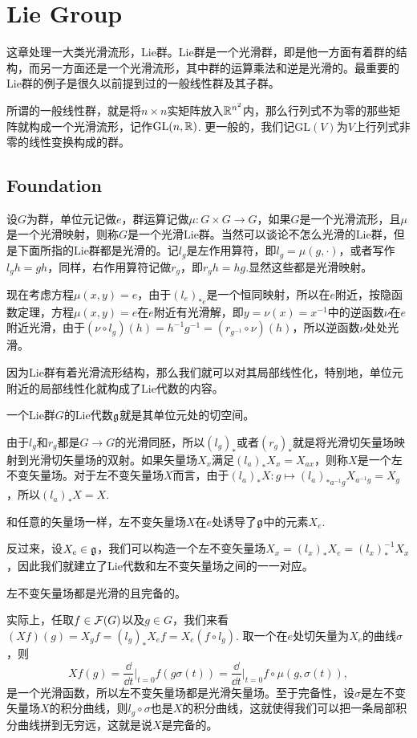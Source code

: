 \chapter{Lie Group}

这章处理一大类光滑流形，Lie群。Lie群是一个光滑群，即是他一方面有着群的结构，而另一方面还是一个光滑流形，其中群的运算乘法和逆是光滑的。最重要的Lie群的例子是很久以前提到过的一般线性群及其子群。

所谓的一般线性群，就是将$n\times n$实矩阵放入$\mathbb{R}^{n^2}$内，那么行列式不为零的那些矩阵就构成一个光滑流形，记作$\mathrm{GL}(n,\mathbb{R})$. 更一般的，我们记$\mathrm{GL}(V)$为$V$上行列式非零的线性变换构成的群。

\section{Foundation}

\para 设$G$为群，单位元记做$e$，群运算记做$\mu:G\times G\to G$，如果$G$是一个光滑流形，且$\mu$是一个光滑映射，则称$G$是一个光滑Lie群。当然可以谈论不怎么光滑的Lie群，但是下面所指的Lie群都是光滑的。记$l_g$是左作用算符，即$l_g=\mu(g,\cdot)$，或者写作$l_gh=gh$，同样，右作用算符记做$r_g$，即$r_gh=hg$.显然这些都是光滑映射。

现在考虑方程$\mu(x,y)=e$，由于$(l_e)_{*e}$是一个恒同映射，所以在$e$附近，按隐函数定理，方程$\mu(x,y)=e$在$e$附近有光滑解，即$y=\nu(x)=x^{-1}$中的逆函数$\nu$在$e$附近光滑，由于$(\nu\circ l_g)(h)=h^{-1}g^{-1}=(r_{g^{-1}}\circ \nu)(h)$，所以逆函数$\nu$处处光滑。

因为Lie群有着光滑流形结构，那么我们就可以对其局部线性化，特别地，单位元附近的局部线性化就构成了Lie代数的内容。

\para 一个Lie群$G$的Lie代数${\mathfrak{g}}$就是其单位元处的切空间。

由于$l_g$和$r_g$都是$G\to G$的光滑同胚，所以$(l_g)_*$或者$(r_g)_*$就是将光滑切矢量场映射到光滑切矢量场的双射。如果矢量场$X_x$满足$(l_a)_*X_x=X_{ax}$，则称$X$是一个左不变矢量场。对于左不变矢量场$X$而言，由于$(l_a)_*X:g\mapsto (l_a)_{*a^{-1}g}X_{a^{-1}g}=X_g$，所以$(l_a)_*X=X$.

和任意的矢量场一样，左不变矢量场$X$在$e$处诱导了${\mathfrak{g}}$中的元素$X_e$.

反过来，设$X_e\in{\mathfrak{g}}$，我们可以构造一个左不变矢量场$X_x=(l_{x})_*X_e=(l_x)^{-1}_*X_x$，因此我们就建立了Lie代数和左不变矢量场之间的一一对应。

\para 左不变矢量场都是光滑的且完备的。

实际上，任取$f\in\mathcal{F}(G)$以及$g\in G$，我们来看$(Xf)(g)=X_gf=(l_g)_{*}X_ef=X_e(f\circ l_g)$. 取一个在$e$处切矢量为$X_e$的曲线$\sigma$，则
\[
	Xf(g)=\frac{\dd }{\dd t}\bigg|_{t=0}f(g\sigma(t))=\frac{\dd }{\dd t}\bigg|_{t=0}f\circ \mu(g,\sigma(t)),
\]
是一个光滑函数，所以左不变矢量场都是光滑矢量场。至于完备性，设$\sigma$是左不变矢量场$X$的积分曲线，则$l_g\circ \sigma$也是$X$的积分曲线，这就使得我们可以把一条局部积分曲线拼到无穷远，这就是说$X$是完备的。

